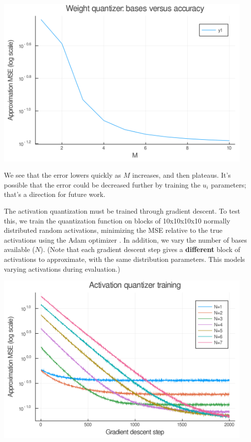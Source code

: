 \documentclass[12pt]{article}
\begin{document}
\begin{center}
\includegraphics[width=5in]{./plots/weighttraining.png}
\end{center}

We see that the error lowers quickly as \(M\) increases, and then plateaus. It's possible that
the error could be decreased further by training the \(u_i\) parameters; that's a direction for future work.

The activation quantization must be trained through gradient descent. To test this, we train the quantization function on blocks of 10x10x10x10 normally distributed random activations, minimizing the MSE relative to the true activations using the Adam optimizer \citep{Adam}. In addition, we vary the number of bases available (\(N\)). (Note that each gradient descent step gives a \textbf{different} block of activations to approximate, with the same distribution parameters. This models varying activations during evaluation.)

\begin{center}
\includegraphics[width=5in]{./plots/acttraining.png}
\end{center}
\end{document}
